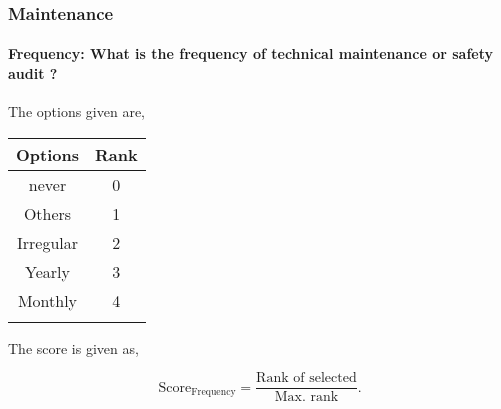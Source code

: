 \documentclass[oneside,twocolumn]{article}
\newcommand{\tsub}[2]{\text{#1}_{\text{#2}}}
\newcommand{\dsub}[2]{\dfrac{\text{#1}}{\text{#2}}}
\newcommand{\singsel}[1]
{
	\[
		\tsub{Score}{#1} = \dsub{Rank of selected}{Max. rank}.
	\]
}
\newenvironment{ttable}
{
\begin{center}
\begin{tabular}{c|c}
\hline
}
{
\\ \hline
\end{tabular}
\end{center}
}
\begin{document}
\subsubsection{Maintenance}

\paragraph{Frequency: What is the frequency of technical maintenance or safety audit ?}

The options given are,
\begin{ttable}
Options & Rank \\ \hline
never & 0 \\
Others & 1 \\
Irregular & 2 \\
Yearly & 3 \\
Monthly & 4 \\
\hline
\end{ttable}
The score is given as,
\singsel{Frequency}
\end{document}
